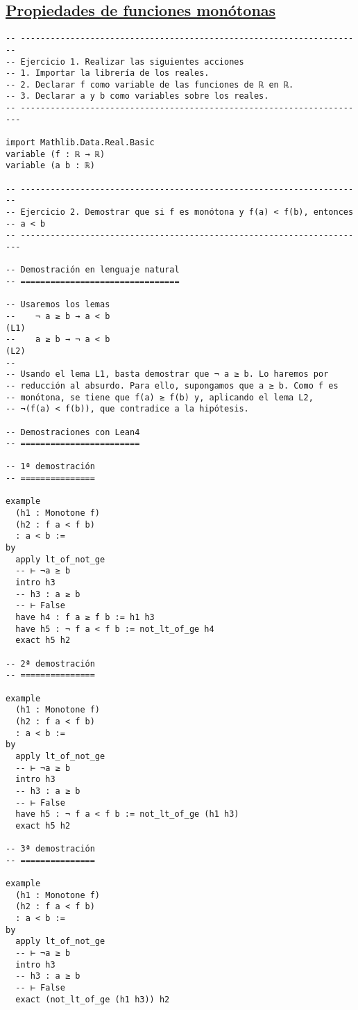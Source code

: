 \subsection{\href{./src/Logica/Propiedades\_de\_funciones\_monotonas.lean}{Propiedades de funciones monótonas}}
\label{sec:orgc282464}
\begin{verbatim}
-- ---------------------------------------------------------------------
-- Ejercicio 1. Realizar las siguientes acciones
-- 1. Importar la librería de los reales.
-- 2. Declarar f como variable de las funciones de ℝ en ℝ.
-- 3. Declarar a y b como variables sobre los reales.
-- ----------------------------------------------------------------------

import Mathlib.Data.Real.Basic
variable (f : ℝ → ℝ)
variable (a b : ℝ)

-- ---------------------------------------------------------------------
-- Ejercicio 2. Demostrar que si f es monótona y f(a) < f(b), entonces
-- a < b
-- ----------------------------------------------------------------------

-- Demostración en lenguaje natural
-- ================================

-- Usaremos los lemas
--    ¬ a ≥ b → a < b                                                (L1)
--    a ≥ b → ¬ a < b                                                (L2)
--
-- Usando el lema L1, basta demostrar que ¬ a ≥ b. Lo haremos por
-- reducción al absurdo. Para ello, supongamos que a ≥ b. Como f es
-- monótona, se tiene que f(a) ≥ f(b) y, aplicando el lema L2,
-- ¬(f(a) < f(b)), que contradice a la hipótesis.

-- Demostraciones con Lean4
-- ========================

-- 1ª demostración
-- ===============

example
  (h1 : Monotone f)
  (h2 : f a < f b)
  : a < b :=
by
  apply lt_of_not_ge
  -- ⊢ ¬a ≥ b
  intro h3
  -- h3 : a ≥ b
  -- ⊢ False
  have h4 : f a ≥ f b := h1 h3
  have h5 : ¬ f a < f b := not_lt_of_ge h4
  exact h5 h2

-- 2ª demostración
-- ===============

example
  (h1 : Monotone f)
  (h2 : f a < f b)
  : a < b :=
by
  apply lt_of_not_ge
  -- ⊢ ¬a ≥ b
  intro h3
  -- h3 : a ≥ b
  -- ⊢ False
  have h5 : ¬ f a < f b := not_lt_of_ge (h1 h3)
  exact h5 h2

-- 3ª demostración
-- ===============

example
  (h1 : Monotone f)
  (h2 : f a < f b)
  : a < b :=
by
  apply lt_of_not_ge
  -- ⊢ ¬a ≥ b
  intro h3
  -- h3 : a ≥ b
  -- ⊢ False
  exact (not_lt_of_ge (h1 h3)) h2


\end{verbatim}
